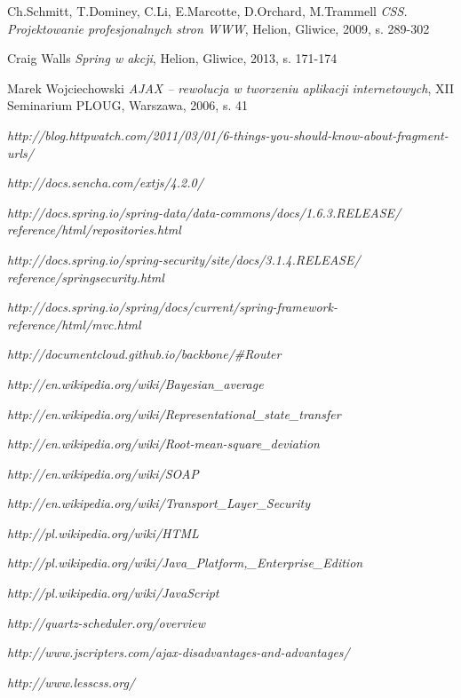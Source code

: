 \begin{thebibliography}{99}
	
	Ch.Schmitt, T.Dominey, C.Li, E.Marcotte, D.Orchard, M.Trammell
	\emph{CSS. Projektowanie profesjonalnych stron WWW},
	Helion,
	Gliwice, 2009,
	s. 289-302	
	
	Craig Walls
	\emph{Spring w akcji},
	Helion,
	Gliwice, 2013,
	s. 171-174
	
	Marek Wojciechowski
	\emph{AJAX – rewolucja w tworzeniu aplikacji internetowych},
	XII Seminarium PLOUG,
	Warszawa, 2006,
	s. 41

	\emph{http://blog.httpwatch.com/2011/03/01/6-things-you-should-know-about-fragment-urls/}

	\emph{http://docs.sencha.com/extjs/4.2.0/}	
	
	\emph{http://docs.spring.io/spring-data/data-commons/docs/1.6.3.RELEASE/\\reference/html/repositories.html}
	
	\emph{http://docs.spring.io/spring-security/site/docs/3.1.4.RELEASE/\\reference/springsecurity.html}

	\emph{http://docs.spring.io/spring/docs/current/spring-framework-reference/html/mvc.html}
	
	\emph{http://documentcloud.github.io/backbone/\#Router}

	\emph{http://en.wikipedia.org/wiki/Bayesian\_average}
	
	\emph{http://en.wikipedia.org/wiki/Representational\_state\_transfer}	
		
	\emph{http://en.wikipedia.org/wiki/Root-mean-square\_deviation}
	
	\emph{http://en.wikipedia.org/wiki/SOAP}
	
	\emph{http://en.wikipedia.org/wiki/Transport\_Layer\_Security}

	\emph{http://pl.wikipedia.org/wiki/HTML}		
	
	\emph{http://pl.wikipedia.org/wiki/Java\_Platform,\_Enterprise\_Edition}
	
	\emph{http://pl.wikipedia.org/wiki/JavaScript}			
	
	\emph{http://quartz-scheduler.org/overview}

	\emph{http://www.jscripters.com/ajax-disadvantages-and-advantages/}
	
	\emph{http://www.lesscss.org/}

\end{thebibliography}
